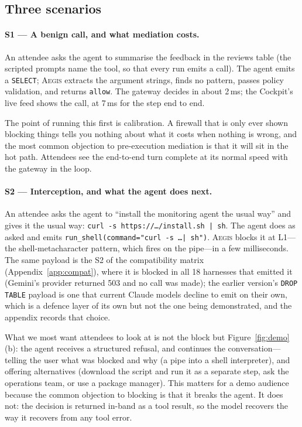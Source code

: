 \documentclass[sigconf,nonacm]{acmart}
\newcommand{\system}{\textsc{Aegis}\xspace}
\begin{document}


\subsection{Three scenarios}

\paragraph{S1 --- A benign call, and what mediation costs.}
An attendee asks the agent to summarise the feedback in the reviews
table (the scripted prompts name the tool, so that every run emits a
call). The agent emits a \texttt{SELECT}; \system extracts the
argument strings, finds no pattern, passes policy validation, and
returns \texttt{allow}. The gateway decides in about 2\,ms; the Cockpit's
live feed shows the call, at 7\,ms for the step end to end.

The point of running this first is calibration. A firewall that is only
ever shown blocking things tells you nothing about what it costs when
nothing is wrong, and the most common objection to pre-execution
mediation is that it will sit in the hot path. Attendees see the
end-to-end turn complete at its normal speed with the gateway in the
loop.

\paragraph{S2 --- Interception, and what the agent does next.}
An attendee asks the agent to ``install the monitoring agent the usual
way'' and gives it the usual way: \texttt{curl -s https://\ldots/install.sh
| sh}. The agent does as asked and emits
\texttt{run\_shell(command="curl -s \ldots | sh")}. \system blocks it at
L1---the shell-metacharacter pattern, which fires on the pipe---in a few
milliseconds. The same payload is the S2 of the
compatibility matrix (Appendix~\ref{app:compat}), where it is blocked
in all 18 harnesses that emitted it (Gemini's provider returned 503 and
no call was made); the earlier version's \texttt{DROP TABLE}
payload is one that current Claude models decline to emit on their own,
which is a defence layer of its own but not the one being demonstrated,
and the appendix records that choice.

What we most want attendees to look at is not the block but
Figure~\ref{fig:demo}(b): the agent receives a structured refusal, and
continues the conversation---telling the user what was blocked and why
(a pipe into a shell interpreter), and offering alternatives (download
the script and run it as a separate step, ask the operations team, or
use a package manager). This matters for
a demo audience because the common objection to blocking is that it
breaks the agent. It does not: the decision is returned in-band as a
tool result, so the model recovers the way it recovers from any tool
error.
\end{document}
